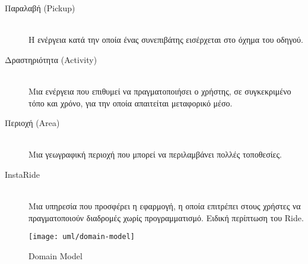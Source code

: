 \begin{description}
    \item[Παραλαβή (Pickup)] \hfill \\
        Η ενέργεια κατά την οποία ένας συνεπιβάτης εισέρχεται στο όχημα του οδηγού.

    \item[Δραστηριότητα (Activity)] \hfill \\
        Μια ενέργεια που επιθυμεί να πραγματοποιήσει ο χρήστης, σε συγκεκριμένο τόπο και χρόνο, για
        την οποία απαιτείται μεταφορικό μέσο.

    \item[Περιοχή (Area)] \hfill \\
        Μια γεωγραφική περιοχή που μπορεί να περιλαμβάνει πολλές τοποθεσίες.

    \item[InstaRide] \hfill \\
        Μια υπηρεσία που προσφέρει η εφαρμογή, η οποία επιτρέπει στους χρήστες να
        πραγματοποιούν διαδρομές χωρίς προγραμματισμό. Ειδική περίπτωση του Ride.
\end{description}

\begin{figure}
    \centering
    \texttt{[image: uml/domain-model]}
    \caption{Domain Model}
\end{figure}


